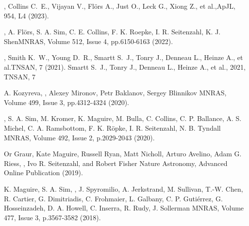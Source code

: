 {, Collins C.~E., Vijayan V., Fl{\"o}rs A., Just O., Leck G., Xiong Z., et al.,}{ApJL, 954, L4 (2023).}


{, A. Flörs, S. A. Sim, C. E. Collins, F. K. Roepke, I. R. Seitenzahl, K. J. Shen}{MNRAS, Volume 512, Issue 4, pp.6150-6163 (2022).}

{, Smith K.~W., Young D.~R., Smartt S.~J., Tonry J., Denneau L., Heinze A., et al.}{TNSAN, 7 (2021).}
 Smartt S.~J., Tonry J., Denneau L., Heinze A., et al., 2021, TNSAN, 7

{A. Kozyreva, , Alexey Mironov, Petr Baklanov, Sergey Blinnikov}
{MNRAS, Volume 499, Issue 3, pp.4312-4324 (2020).}

{, S. A. Sim, M. Kromer, K. Maguire, M. Bulla, C. Collins, C. P. Ballance, A. S. Michel, C. A. Ramsbottom, F. K. R\"opke, I. R. Seitenzahl, N. B. Tyndall}
{MNRAS, Volume 492, Issue 2, p.2029-2043 (2020).}

{Or Graur, Kate Maguire, Russell Ryan, Matt Nicholl, Arturo Avelino, Adam G. Riess, , Ivo R. Seitenzahl, and Robert Fisher}
{Nature Astronomy, Advanced Online Publication (2019).}

{K. Maguire, S. A. Sim, , J. Spyromilio, A. Jerkstrand, M. Sullivan, T.-W. Chen, R. Cartier, G. Dimitriadis, C. Frohmaier, L. Galbany, C. P. Gutiérrez, G. Hosseinzadeh, D. A. Howell, C. Inserra, R. Rudy, J. Sollerman}
{MNRAS, Volume 477, Issue 3, p.3567-3582 (2018).}

